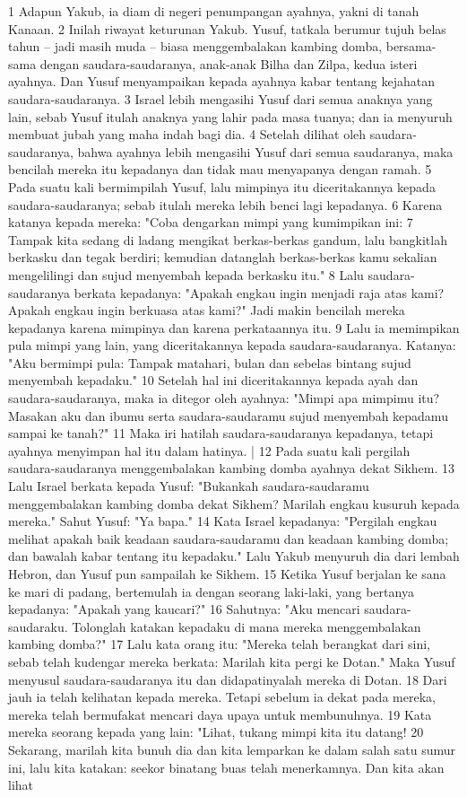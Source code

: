 \begin{biblechapter} %
1 Adapun Yakub, ia diam di negeri penumpangan ayahnya, yakni di tanah Kanaan. 2 Inilah riwayat keturunan Yakub. Yusuf, tatkala berumur tujuh belas tahun -- jadi masih muda -- biasa menggembalakan kambing domba, bersama-sama dengan saudara-saudaranya, anak-anak Bilha dan Zilpa, kedua isteri ayahnya. Dan Yusuf menyampaikan kepada ayahnya kabar tentang kejahatan saudara-saudaranya. 3 Israel lebih mengasihi Yusuf dari semua anaknya yang lain, sebab Yusuf itulah anaknya yang lahir pada masa tuanya; dan ia menyuruh membuat jubah yang maha indah bagi dia. 4 Setelah dilihat oleh saudara-saudaranya, bahwa ayahnya lebih mengasihi Yusuf dari semua saudaranya, maka bencilah mereka itu kepadanya dan tidak mau menyapanya dengan ramah. 5 Pada suatu kali bermimpilah Yusuf, lalu mimpinya itu diceritakannya kepada saudara-saudaranya; sebab itulah mereka lebih benci lagi kepadanya. 6 Karena katanya kepada mereka: "Coba dengarkan mimpi yang kumimpikan ini: 7 Tampak kita sedang di ladang mengikat berkas-berkas gandum, lalu bangkitlah berkasku dan tegak berdiri; kemudian datanglah berkas-berkas kamu sekalian mengelilingi dan sujud menyembah kepada berkasku itu." 8 Lalu saudara-saudaranya berkata kepadanya: "Apakah engkau ingin menjadi raja atas kami? Apakah engkau ingin berkuasa atas kami?" Jadi makin bencilah mereka kepadanya karena mimpinya dan karena perkataannya itu. 9 Lalu ia memimpikan pula mimpi yang lain, yang diceritakannya kepada saudara-saudaranya. Katanya: "Aku bermimpi pula: Tampak matahari, bulan dan sebelas bintang sujud menyembah kepadaku." 10 Setelah hal ini diceritakannya kepada ayah dan saudara-saudaranya, maka ia ditegor oleh ayahnya: "Mimpi apa mimpimu itu? Masakan aku dan ibumu serta saudara-saudaramu sujud menyembah kepadamu sampai ke tanah?" 11 Maka iri hatilah saudara-saudaranya kepadanya, tetapi ayahnya menyimpan hal itu dalam hatinya. | 12 Pada suatu kali pergilah saudara-saudaranya menggembalakan kambing domba ayahnya dekat Sikhem. 13 Lalu Israel berkata kepada Yusuf: "Bukankah saudara-saudaramu menggembalakan kambing domba dekat Sikhem? Marilah engkau kusuruh kepada mereka." Sahut Yusuf: "Ya bapa." 14 Kata Israel kepadanya: "Pergilah engkau melihat apakah baik keadaan saudara-saudaramu dan keadaan kambing domba; dan bawalah kabar tentang itu kepadaku." Lalu Yakub menyuruh dia dari lembah Hebron, dan Yusuf pun sampailah ke Sikhem. 15 Ketika Yusuf berjalan ke sana ke mari di padang, bertemulah ia dengan seorang laki-laki, yang bertanya kepadanya: "Apakah yang kaucari?" 16 Sahutnya: "Aku mencari saudara-saudaraku. Tolonglah katakan kepadaku di mana mereka menggembalakan kambing domba?" 17 Lalu kata orang itu: "Mereka telah berangkat dari sini, sebab telah kudengar mereka berkata: Marilah kita pergi ke Dotan." Maka Yusuf menyusul saudara-saudaranya itu dan didapatinyalah mereka di Dotan. 18 Dari jauh ia telah kelihatan kepada mereka. Tetapi sebelum ia dekat pada mereka, mereka telah bermufakat mencari daya upaya untuk membunuhnya. 19 Kata mereka seorang kepada yang lain: "Lihat, tukang mimpi kita itu datang! 20 Sekarang, marilah kita bunuh dia dan kita lemparkan ke dalam salah satu sumur ini, lalu kita katakan: seekor binatang buas telah menerkamnya. Dan kita akan lihat 
\end{biblechapter}
